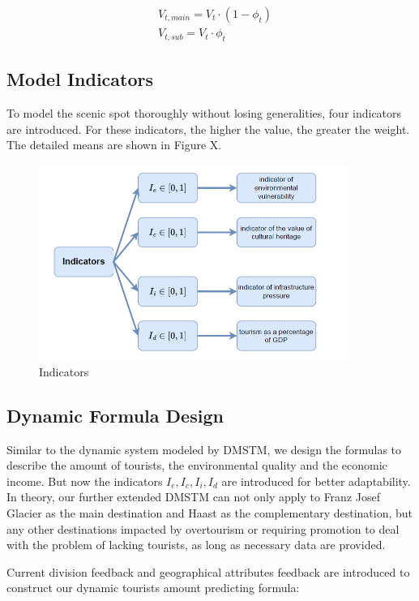 \documentclass{mcmthesis}
\begin{document}
\begin{align}
  & V_{t,main} = V_t \cdot (1 - \phi_t) \\
  & V_{t,sub} = V_t \cdot \phi_t
\end{align}

\subsection{Model Indicators}
To model the scenic spot thoroughly without losing generalities, four indicators are introduced.
For these indicators, the higher the value, the greater the weight. The detailed means are shown in Figure X.

\begin{figure}[H]
  \centering
  \includegraphics[width=0.9\textwidth]{figures/indicators.png}
  \caption{Indicators}
  \label{Fig.XXXX}
\end{figure}

\subsection{Dynamic Formula Design}
Similar to the dynamic system modeled by DMSTM, we design the formulas to describe the amount of tourists, 
the environmental quality and the economic income. But now the indicators $I_e, I_c, I_i, I_d$ are introduced
for better adaptability. In theory, our further extended DMSTM can not only apply to Franz Josef Glacier
as the main destination and Haast as the complementary destination, but any other destinations impacted by 
overtourism or requiring promotion to deal with the problem of lacking tourists, as long as necessary data are provided.

Current division feedback and geographical attributes feedback are introduced to construct our dynamic tourists amount predicting formula:
\end{document}
